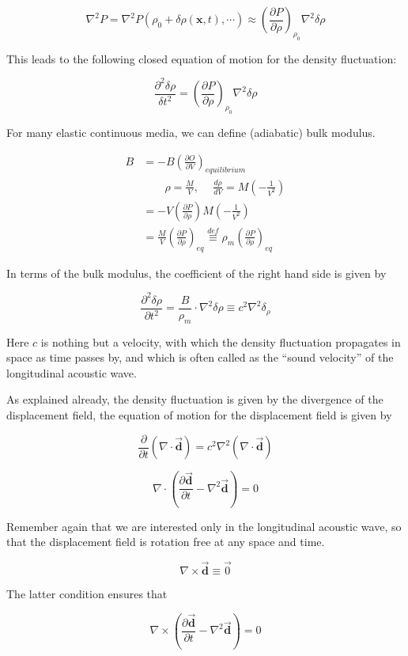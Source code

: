 ﻿\documentclass[twoside]{book}
\numberwithin{equation}{section}
\begin{document}
\[\nabla^2 P = \nabla^2 P(\rho_0+\delta\rho(\bm{x},t),\cdots) \approx\left(\frac{\partial P}{\partial\rho}\right)_{\rho_0}\nabla^2\delta\rho \]

This leads to the following closed equation of motion for the density fluctuation:

\[\frac{\partial^2\delta\rho}{\delta t^2} = \left(\frac{\partial P}{\partial \rho}\right)_{\rho_0}\nabla^2\delta\rho \]

For many elastic continuous media, we can define (adiabatic) bulk modulus. 

\[\begin{split}
B &= -B\left(\frac{\partial O}{\partial V}\right)_{equilibrium}\\
&\quad\quad \rho = \frac{M}{V},\ \quad \frac{d\rho}{dV} = M\left(-\frac{1}{V^2}\right)\\
&= -V\left(\frac{\partial P}{\partial\rho}\right)M\left(-\frac{1}{V^2}\right)\\ &= \frac{M}{V}\left(\frac{\partial P}{\partial \rho}\right)_{eq} \overset{def}{\equiv}\rho_m\left(\frac{\partial P}{\partial\rho}\right)_{eq}
\end{split} \]

In terms of the bulk modulus, the coefficient of the right hand side is given by 

\[\frac{\partial^2\delta\rho}{\partial t^2} = \frac{B}{\rho_m}\cdot\nabla^2\delta\rho \equiv c^2\nabla^2\delta_\rho \]

Here $c$ is nothing but a velocity, with which the density fluctuation propagates in space as time passes by, and which is often called as the ``sound velocity'' of the longitudinal acoustic wave. 

As explained already, the density fluctuation is given by the divergence of the displacement field, the equation of motion for the displacement field is given by 

\[\frac{\partial}{\partial t}(\nabla\cdot\vec{\bm{d}}) = c^2\nabla^2(\nabla\cdot\vec{\bm{d}}) \]

\[\nabla\cdot\left(\frac{\partial \vec{\bm{d}}}{\partial t} - \nabla^2\vec{\bm{d}}\right) = 0 \]

Remember again that we are interested only in the longitudinal acoustic wave, so that the displacement field is rotation free at any space and time. 

\[\nabla\times\vec{\bm{d}} \equiv\vec{0} \]

The latter condition ensures that

\[\nabla\times\left(\frac{\partial \vec{\bm{d}}}{\partial t} - \nabla^2\vec{\bm{d}}\right) = 0\]
\end{document}
